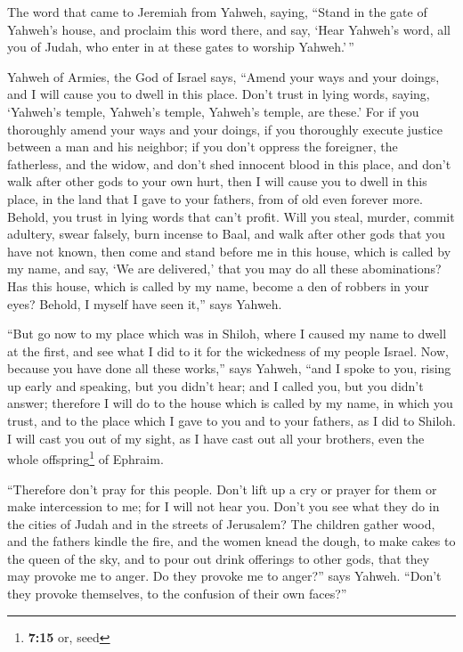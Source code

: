  The word that came to Jeremiah from Yahweh, saying,
 ``Stand in the gate of Yahweh's house, and proclaim this
word there, and say, `Hear Yahweh's word, all you of Judah, who enter in
at these gates to worship Yahweh.'\,''

 Yahweh of Armies, the God of Israel says, ``Amend your
ways and your doings, and I will cause you to dwell in this place.
 Don't trust in lying words, saying, `Yahweh's temple,
Yahweh's temple, Yahweh's temple, are these.'  For if you
thoroughly amend your ways and your doings, if you thoroughly execute
justice between a man and his neighbor;  if you don't
oppress the foreigner, the fatherless, and the widow, and don't shed
innocent blood in this place, and don't walk after other gods to your
own hurt,  then I will cause you to dwell in this place,
in the land that I gave to your fathers, from of old even forever more.
 Behold, you trust in lying words that can't profit.
 Will you steal, murder, commit adultery, swear falsely,
burn incense to Baal, and walk after other gods that you have not known,
 then come and stand before me in this house, which is
called by my name, and say, `We are delivered,' that you may do all
these abominations?  Has this house, which is called by
my name, become a den of robbers in your eyes? Behold, I myself have
seen it,'' says Yahweh.

 ``But go now to my place which was in Shiloh, where I
caused my name to dwell at the first, and see what I did to it for the
wickedness of my people Israel.  Now, because you have
done all these works,'' says Yahweh, ``and I spoke to you, rising up
early and speaking, but you didn't hear; and I called you, but you
didn't answer;  therefore I will do to the house which is
called by my name, in which you trust, and to the place which I gave to
you and to your fathers, as I did to Shiloh.  I will cast
you out of my sight, as I have cast out all your brothers, even the
whole offspring\footnote{\textbf{7:15} or, seed} of Ephraim.

 ``Therefore don't pray for this people. Don't lift up a
cry or prayer for them or make intercession to me; for I will not hear
you.  Don't you see what they do in the cities of Judah
and in the streets of Jerusalem?  The children gather
wood, and the fathers kindle the fire, and the women knead the dough, to
make cakes to the queen of the sky, and to pour out drink offerings to
other gods, that they may provoke me to anger.  Do they
provoke me to anger?'' says Yahweh. ``Don't they provoke themselves, to
the confusion of their own faces?''

